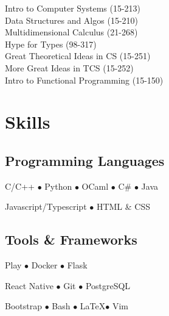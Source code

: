\documentclass[]{openfont}
\begin{document}
\begin{minipage}[t]{0.39\textwidth}
Intro to Computer Systems (15-213) \\
Data Structures and Algos (15-210) \\
Multidimensional Calculus (21-268) \\
Hype for Types (98-317) \\

Great Theoretical Ideas in CS (15-251) \\
More Great Ideas in TCS (15-252) \\
Intro to Functional Programming (15-150) \\
\sectionsep


\section{Skills}
\subsection{Programming Languages}
\vspace{\topsep}
C/C++ \(\bullet\)
Python \(\bullet\)
OCaml \(\bullet\)
C\# \(\bullet\)
Java

Javascript/Typescript \(\bullet\)
HTML \& CSS

\sectionsep

\subsection{Tools \& Frameworks}
\vspace{\topsep}
Play \(\bullet\)
Docker \(\bullet\)
Flask

React Native \(\bullet\)
Git \(\bullet\)
PostgreSQL

Bootstrap \(\bullet\)
Bash \(\bullet\)
\LaTeX \(\bullet\)
Vim
\sectionsep

%
%

\end{minipage} 
\hfill
\end{document}
